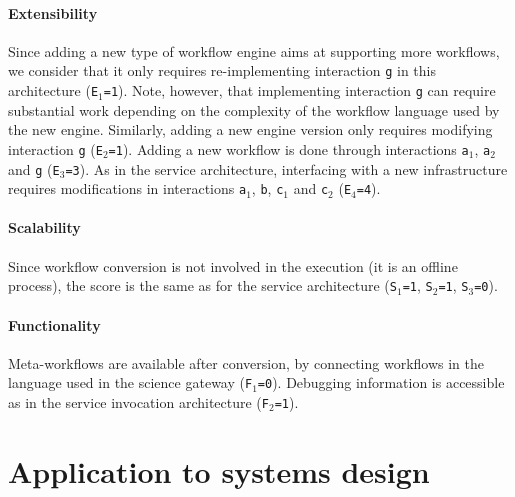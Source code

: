 \documentclass[preprint,3p,twocolumn]{elsarticle}
\newcommand{\correction}[1]{\color{blue}#1\color{black}\xspace}
\begin{document}
\paragraph{Extensibility} Since adding a new type of workflow engine
aims at supporting more workflows, we consider that it only requires
re-implementing interaction \texttt{g} in this architecture  (\texttt{E$_1$=1}). Note,
however, that implementing interaction \texttt{g} can require
substantial work depending on the complexity of the workflow language used by
the new engine. Similarly, adding a
new engine version only requires modifying interaction \texttt{g}
(\texttt{E$_2$=1}).  Adding a new workflow is done through
interactions \texttt{a$_1$}, \texttt{a$_2$} and \texttt{g} (\texttt{E$_3$=3}). As in the
service architecture, interfacing with a new infrastructure requires
modifications in interactions \texttt{a$_1$}, \texttt{b}, \texttt{c$_1$}
and \texttt{c$_2$} (\texttt{E$_4$=4}).

\paragraph{Scalability}  Since workflow conversion is not involved in
the execution (it is an offline process), the score is the same as for the
service architecture (\texttt{S$_1$=1},
\texttt{S$_2$=1}, \texttt{S$_3$=0}).

\paragraph{\correction{Functionality}} Meta-workflows are available after
conversion, by connecting workflows in the language used in the
science gateway (\texttt{\correction{F}$_1$=0}).  Debugging information is accessible
as in the service invocation architecture (\texttt{\correction{F}$_2$=1}).

\correction{\section{Application to systems design}}
\label{sec:application}
\end{document}
